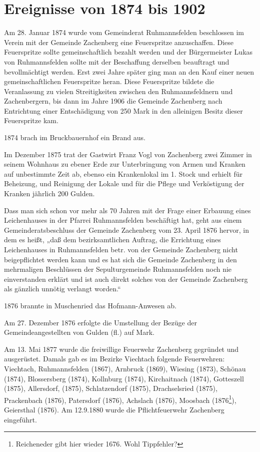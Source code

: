 \documentclass{book}
\begin{document}
\section{Ereignisse von 1874 bis 1902}

Am 28. Januar 1874 wurde vom Gemeinderat Ruhmannsfelden beschlossen im
Verein mit der Gemeinde Zachenberg eine Feuerspritze anzuschaffen. Diese
Feuerspritze sollte gemeinschaftlich bezahlt werden und der
Bürgermeister Lukas von Ruhmannsfelden sollte mit der Beschaffung
derselben beauftragt und bevollmächtigt werden. Erst zwei Jahre später
ging man an den Kauf einer neuen gemeinschaftlichen Feuerspritze heran.
Diese Feuerspritze bildete die Veranlassung zu vielen Streitigkeiten
zwischen den Ruhmannsfeldnern und Zachenbergern, bis dann im Jahre 1906
die Gemeinde Zachenberg nach Entrichtung einer Entschädigung von 250
Mark in den alleinigen Besitz dieser Feuerspritze kam.

1874 brach im Bruckbauernhof ein Brand aus.

Im Dezember 1875 trat der Gastwirt Franz Vogl von Zachenberg zwei Zimmer
in seinem Wohnhaus zu ebener Erde zur Unterbringung von Armen und
Kranken auf unbestimmte Zeit ab, ebenso ein Krankenlokal im 1. Stock und
erhielt für Beheizung, und Reinigung der Lokale und für die Pflege und
Verköstigung der Kranken jährlich 200 Gulden.

Dass man sich schon vor mehr als 70 Jahren mit der Frage einer Erbauung
eines Leichenhauses in der Pfarrei Ruhmannsfelden beschäftigt hat, geht
aus einem Gemeinderatsbeschluss der Gemeinde Zachenberg vom 23. April
1876 hervor, in dem es heißt, „daß dem bezirksamtlichen Auftrag, die
Errichtung eines Leichenhauses in Ruhmannsfelden betr. von der Gemeinde
Zachenberg nicht beigepflichtet werden kann und es hat sich die Gemeinde
Zachenberg in den mehrmaligen Beschlüssen der Sepulturgemeinde
Ruhmannsfelden noch nie einverstanden erklärt und ist auch direkt
solches von der Gemeinde Zachenberg als gänzlich unnötig verlangt
worden.“

1876 brannte in Muschenried das Hofmann-Anwesen ab.

Am 27. Dezember 1876 erfolgte die Umstellung der Bezüge der
Gemeindeangestellten von Gulden (fl.) auf Mark.

Am 13. Mai 1877 wurde die freiwillige Feuerwehr Zachenberg gegründet und
ausgerüstet. Damals gab es im Bezirke Viechtach folgende Feuerwehren:
Viechtach, Ruhmannsfelden (1867), Arnbruck (1869), Wiesing (1873),
Schönau (1874), Blossersberg (1874), Kollnburg (1874), Kirchaitnach
(1874), Gotteszell (1875), Allersdorf, (1875), Schlatzendorf (1875),
Drachselsried (1875), Prackenbach (1876), Patersdorf (1876), Achslach
(1876), Moosbach (1876\footnote{Reicheneder gibt hier wieder 1676. Wohl
Tippfehler?}), Geiersthal (1876). Am 12.9.1880 wurde die
Pflichtfeuerwehr Zachenberg eingeführt.
\end{document}
